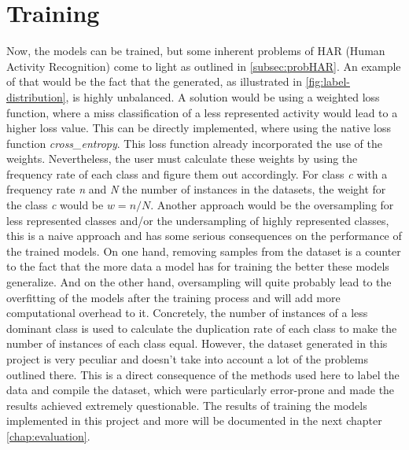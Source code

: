 	\section{Training}\label{section:training}
		Now, the models can be trained, but some inherent problems of HAR (Human Activity Recognition) come to light as outlined in \ref{subsec:probHAR}. An example of that would be the fact that the generated, as illustrated in \ref{fig:label-distribution}, is highly unbalanced. A solution would be using a weighted loss function, where a miss classification of a less represented activity would lead to a higher loss value. This can be directly implemented, where using the native loss function \textit{cross\_entropy}. This loss function already incorporated the use of the weights. Nevertheless, the user must calculate these weights by using the frequency rate of each class and figure them out accordingly. For class \textit{c} with a frequency rate \textit{n} and \textit{N} the number of instances in the datasets, the weight for the class \textit{c} would be $w=n/N$. Another approach would be the oversampling for less represented classes and/or the undersampling of highly represented classes, this is a naive approach and has some serious consequences on the performance of the trained models. On one hand, removing samples from the dataset is a counter to the fact that the more data a model has for training the better these models generalize. And on the other hand, oversampling will quite probably lead to the overfitting of the models after the training process and will add more computational overhead to it. Concretely, the number of instances of a less dominant class is used to calculate the duplication rate of each class to make the number of instances of each class equal.\newline
		However, the dataset generated in this project is very peculiar and doesn't take into account a lot of the problems outlined there. This is a direct consequence of the methods used here to label the data and compile the dataset, which were particularly error-prone and made the results achieved extremely questionable. The results of training the models implemented in this project and more will be documented in the next chapter \ref{chap:evaluation}.

